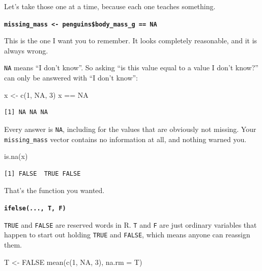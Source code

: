\documentclass[
  letterpaper,
  justified,
  a4paper]{tufte-book}
\makeatletter
\newenvironment{Shaded}{\begin{snugshade}}{\end{snugshade}}
\newcommand{\AttributeTok}[1]{\textcolor[rgb]{0.40,0.45,0.13}{#1}}
\newcommand{\ConstantTok}[1]{\textcolor[rgb]{0.56,0.35,0.01}{#1}}
\newcommand{\DecValTok}[1]{\textcolor[rgb]{0.68,0.00,0.00}{#1}}
\newcommand{\FunctionTok}[1]{\textcolor[rgb]{0.28,0.35,0.67}{#1}}
\newcommand{\NormalTok}[1]{\textcolor[rgb]{0.00,0.23,0.31}{#1}}
\newcommand{\OtherTok}[1]{\textcolor[rgb]{0.00,0.23,0.31}{#1}}
\newcommand{\SpecialCharTok}[1]{\textcolor[rgb]{0.37,0.37,0.37}{#1}}
\let\rbporigShaded\Shaded
\let\rbporigendShaded\endShaded
\renewenvironment{Shaded}{%
  \begingroup
  \ifdim\linewidth=\rbpbodywidth
    \advance\linewidth by \@tufte@overhang
    \advance\hsize by \@tufte@overhang
    \advance\columnwidth by \@tufte@overhang
  \fi
  \rbporigShaded
}{%
  \rbporigendShaded
  \endgroup
}
\makeatother
\begin{document}
Let's take those one at a time, because each one teaches something.

\textbf{\texttt{missing\_mass\ \textless{}-\ penguins\$body\_mass\_g\ ==\ NA}}

This is the one I want you to remember. It looks completely reasonable,
and it is always wrong.

\texttt{NA} means ``I don't know''. So asking ``is this value equal to a
value I don't know?'' can only be answered with ``I don't know'':

\begin{Shaded}
\begin{Highlighting}[]
\NormalTok{x }\OtherTok{\textless{}{-}} \FunctionTok{c}\NormalTok{(}\DecValTok{1}\NormalTok{, }\ConstantTok{NA}\NormalTok{, }\DecValTok{3}\NormalTok{)}
\NormalTok{x }\SpecialCharTok{==} \ConstantTok{NA}
\end{Highlighting}
\end{Shaded}

\begin{verbatim}
[1] NA NA NA
\end{verbatim}

Every answer is \texttt{NA}, including for the values that are obviously
not missing. Your \texttt{missing\_mass} vector contains no information
at all, and nothing warned you.

\begin{Shaded}
\begin{Highlighting}[]
\FunctionTok{is.na}\NormalTok{(x)}
\end{Highlighting}
\end{Shaded}

\begin{verbatim}
[1] FALSE  TRUE FALSE
\end{verbatim}

That's the function you wanted.

\textbf{\texttt{ifelse(...,\ T,\ F)}}

\texttt{TRUE} and \texttt{FALSE} are reserved words in R. \texttt{T} and
\texttt{F} are just ordinary variables that happen to start out holding
\texttt{TRUE} and \texttt{FALSE}, which means anyone can reassign them.

\begin{Shaded}
\begin{Highlighting}[]
\NormalTok{T }\OtherTok{\textless{}{-}} \ConstantTok{FALSE}
\FunctionTok{mean}\NormalTok{(}\FunctionTok{c}\NormalTok{(}\DecValTok{1}\NormalTok{, }\ConstantTok{NA}\NormalTok{, }\DecValTok{3}\NormalTok{), }\AttributeTok{na.rm =}\NormalTok{ T)}
\end{Highlighting}
\end{Shaded}
\end{document}
